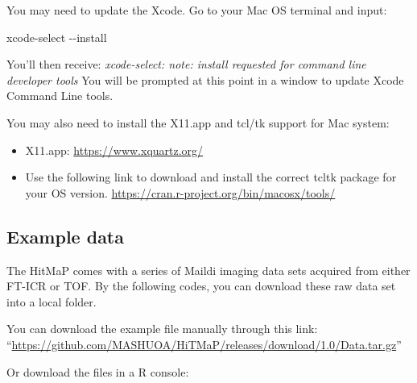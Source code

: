 \documentclass[
]{article}
\newenvironment{Shaded}{\begin{snugshade}}{\end{snugshade}}
\newcommand{\ExtensionTok}[1]{#1}
\newcommand{\NormalTok}[1]{#1}
\begin{document}
You may need to update the Xcode. Go to your Mac OS terminal and input:

\begin{Shaded}
\begin{Highlighting}[]
\ExtensionTok{xcode{-}select}\NormalTok{ {-}{-}install}
\end{Highlighting}
\end{Shaded}

You'll then receive: \emph{xcode-select: note: install requested for
command line developer tools} You will be prompted at this point in a
window to update Xcode Command Line tools.

You may also need to install the X11.app and tcl/tk support for Mac
system:

\begin{itemize}
\item
  X11.app: \url{https://www.xquartz.org/}
\item
  Use the following link to download and install the correct tcltk
  package for your OS version.
  \url{https://cran.r-project.org/bin/macosx/tools/}
\end{itemize}

\hypertarget{example-data}{%
\subsection{Example data}\label{example-data}}

The HitMaP comes with a series of Maildi imaging data sets acquired from
either FT-ICR or TOF. By the following codes, you can download these raw
data set into a local folder.

You can download the example file manually through this link:
``\url{https://github.com/MASHUOA/HiTMaP/releases/download/1.0/Data.tar.gz}''

Or download the files in a R console:
\end{document}
